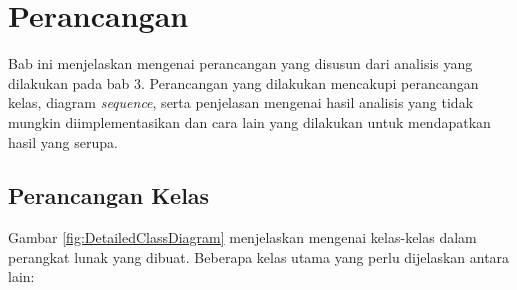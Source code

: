 \chapter{Perancangan}
\label{chap:perancangan}

Bab ini menjelaskan mengenai perancangan yang disusun dari analisis yang dilakukan pada bab 3. Perancangan yang dilakukan mencakupi perancangan kelas, diagram \textit{sequence}, serta penjelasan mengenai hasil analisis yang tidak mungkin diimplementasikan dan cara lain yang dilakukan untuk mendapatkan hasil yang serupa.



\section{Perancangan Kelas}
\label{sec:perancangan_kelas}

Gambar \ref{fig:DetailedClassDiagram} menjelaskan mengenai kelas-kelas dalam perangkat lunak yang dibuat. Beberapa kelas utama yang perlu dijelaskan antara lain:

